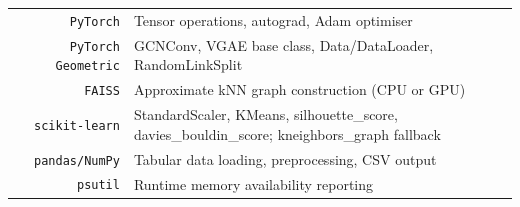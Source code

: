 \documentclass[11pt]{article}
\begin{document}
\begin{table}[H]
\begin{tabular}{ r p{} }
\texttt{PyTorch}
& Tensor operations, autograd, Adam optimiser \\
\texttt{PyTorch Geometric}
& GCNConv, VGAE base class, Data/DataLoader, RandomLinkSplit \\
\texttt{FAISS}
& Approximate kNN graph construction (CPU or GPU) \\
\texttt{scikit-learn}
& StandardScaler, KMeans, silhouette\_score, davies\_bouldin\_score; kneighbors\_graph fallback \\
\texttt{pandas/NumPy}
& Tabular data loading, preprocessing, CSV output \\
\texttt{psutil}
& Runtime memory availability reporting
\end{tabular}
\end{table}


\end{document}
